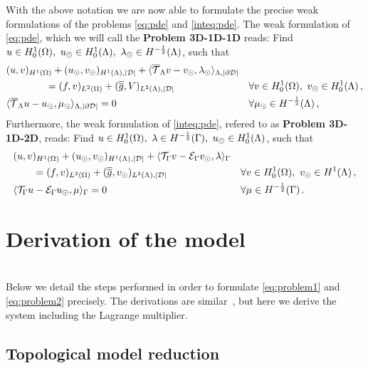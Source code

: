 \documentclass[r]{siamart171218}
\begin{document}
With the above notation we are now able to formulate the precise weak formulations of the problems 
\eqref{eq:pde} and \eqref{inteq:pde}. 
The weak formulation of \eqref{eq:pde}, which we will call the \textbf{Problem 3D-1D-1D} reads: 
Find $u \in H^1_0(\Omega),\ u_{\odot} \in H^1_0(\Lambda), \ \lambda_{\odot} \in H^{-\frac12}(\Lambda)$, such that
\begin{subequations}\label{eq:problem2}
\begin{align}
&(u,v)_{H^1(\Omega)} + (u_{\odot},v_{\odot})_{H^1(\Lambda),|\mathcal{D}|} 
+  \langle {\overline{\mathcal{T}}_\Lambda} v - v_{\odot}, \lambda_{\odot} \rangle_{\Lambda, |\partial\mathcal{D}|} &&
\\
\nonumber
&\qquad\qquad= (f,v)_{L^2(\Omega)} +  (\overline{\overline{g}},V)_{L^2(\Lambda),|\mathcal{D}|}
\quad && \forall v \in H^1_0(\Omega), \ v_{\odot} \in H^1_0(\Lambda)\,,
\\
& \langle {\overline{\mathcal{T}}_\Lambda} u -   u_{\odot}, \mu_{\odot} \rangle_{\Lambda,|\partial\mathcal{D}|} = 0
\quad &&\forall \mu_{\odot} \in H^{-\frac12}(\Lambda)\,,
\end{align}
\end{subequations}
Furthermore, the weak formulation of \eqref{inteq:pde}, refered to as \textbf{Problem 3D-1D-2D}, reads: 
Find $u \in H^1_0(\Omega), \ \lambda \in H^{-\frac12}(\Gamma ),\ u_{\odot} \in H^1_0(\Lambda)$, such that
\begin{subequations}\label{eq:problem1}
\begin{align}
&(u,v)_{H^1(\Omega)} + (u_{\odot},v_{\odot})_{H^1(\Lambda),|\mathcal{D}|} 
+ \langle {\mathcal{T}_\Gamma} v  - \mathcal{E}_\Gamma v_{\odot}, \lambda \rangle_\Gamma &&
\\
\nonumber
&\qquad= (f,v)_{L^2(\Omega)} +  (\overline{\overline{g}},v_{\odot})_{L^2(\Lambda),|\mathcal{D}|}
\quad &&\forall v \in H^1_0(\Omega), \ v_{\odot} \in H^1(\Lambda)\,,
\\
& \langle {\mathcal{T}_\Gamma} u - \mathcal{E}_\Gamma u_{\odot} , \mu \rangle_\Gamma = 0
\quad && \forall \mu \in H^{-\frac12}(\Gamma)\,.
\end{align}
\end{subequations}


\section{Derivation of the model} \\
Below we detail the steps performed in order to formulate \ref{eq:problem1} and \ref{eq:problem2} precisely. 
The derivations are similar~\cite{laurino_m2an},  but here we derive the system including the Lagrange multiplier. 

\subsection{Topological model reduction}
\end{document}
